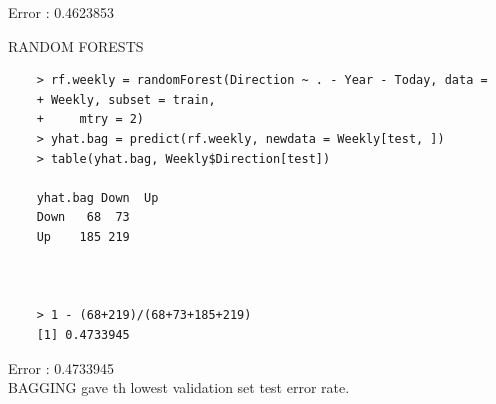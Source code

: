\documentclass{article}
\begin{document}
Error : 0.4623853 \\

\newpage

RANDOM FORESTS

\begin{program}
	\begin{verbatim}
	> rf.weekly = randomForest(Direction ~ . - Year - Today, data =
	+ Weekly, subset = train,
	+     mtry = 2)
	> yhat.bag = predict(rf.weekly, newdata = Weekly[test, ])
	> table(yhat.bag, Weekly$Direction[test])
	
	yhat.bag Down  Up
	Down   68  73
	Up    185 219



	> 1 - (68+219)/(68+73+185+219)
	[1] 0.4733945
	\end{verbatim}
\end{program}

Error : 0.4733945 \\

BAGGING gave th lowest validation set test error rate.
\end{document}
